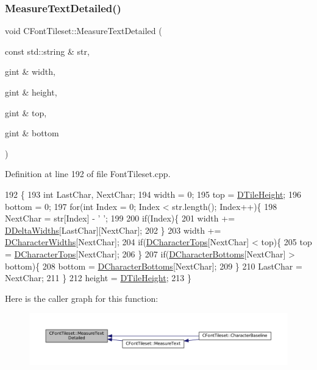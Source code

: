\subsubsection{\texorpdfstring{Measure\+Text\+Detailed()}{MeasureTextDetailed()}}
{\footnotesize\ttfamily void C\+Font\+Tileset\+::\+Measure\+Text\+Detailed (\begin{DoxyParamCaption}\item[{const std\+::string \&}]{str,  }\item[{gint \&}]{width,  }\item[{gint \&}]{height,  }\item[{gint \&}]{top,  }\item[{gint \&}]{bottom }\end{DoxyParamCaption})}



Definition at line 192 of file Font\+Tileset.\+cpp.


\begin{DoxyCode}
192                                                                                                            
         \{
193     \textcolor{keywordtype}{int} LastChar, NextChar;
194     width = 0;
195     top = \hyperlink{classCGraphicTileset_af48f32e07d5fe69afd5f764318cc3244}{DTileHeight};
196     bottom = 0;
197     \textcolor{keywordflow}{for}(\textcolor{keywordtype}{int} Index = 0; Index < str.length(); Index++)\{
198         NextChar = str[Index] - \textcolor{charliteral}{' '};
199         
200         \textcolor{keywordflow}{if}(Index)\{
201             width += \hyperlink{classCFontTileset_a1e253853e14282e9582a7f47dace8f70}{DDeltaWidths}[LastChar][NextChar]; 
202         \}
203         width += \hyperlink{classCFontTileset_ad25347b5350a8380be8c550d9f2e2798}{DCharacterWidths}[NextChar]; 
204         \textcolor{keywordflow}{if}(\hyperlink{classCFontTileset_aa009ebe41a491d854a5f6005919649c2}{DCharacterTops}[NextChar] < top)\{
205             top = \hyperlink{classCFontTileset_aa009ebe41a491d854a5f6005919649c2}{DCharacterTops}[NextChar];   
206         \}
207         \textcolor{keywordflow}{if}(\hyperlink{classCFontTileset_a13d7063022d59bf3347452c78be50a8b}{DCharacterBottoms}[NextChar] > bottom)\{
208             bottom = \hyperlink{classCFontTileset_a13d7063022d59bf3347452c78be50a8b}{DCharacterBottoms}[NextChar];   
209         \}
210         LastChar = NextChar;
211     \}
212     height = \hyperlink{classCGraphicTileset_af48f32e07d5fe69afd5f764318cc3244}{DTileHeight};
213 \}
\end{DoxyCode}
Here is the caller graph for this function\+:\nopagebreak
\begin{figure}[H]
\begin{center}
\leavevmode
\includegraphics[width=350pt]{classCFontTileset_a7afa08157a6bea6c0fbd06299685b8b3_icgraph}
\end{center}
\end{figure}



